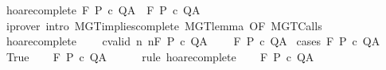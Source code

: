 \begin{isabellebody}
\isanewline
{}\isamarkupfalse%
%
\endisatagproof
{\isafoldproof}%
%
\isadelimproof
\isanewline
%
\endisadelimproof
\isanewline
{}\isamarkupfalse%
\ hoare{\isacharunderscore}complete{\isacharcolon}\ {\isachardoublequoteopen}{\isasymGamma}{\isasymTurnstile}\isactrlbsub {\isacharslash}F\isactrlesub \ P\ c\ Q{\isacharcomma}A\ {\isasymLongrightarrow}\ {\isasymGamma}{\isacharcomma}{\isacharbraceleft}{\isacharbraceright}{\isasymturnstile}\isactrlbsub {\isacharslash}F\isactrlesub \ P\ c\ Q{\isacharcomma}A{\isachardoublequoteclose}\isanewline
%
\isadelimproof
\ \ %
\endisadelimproof
%
\isatagproof
{}\isamarkupfalse%
\ {\isacharparenleft}iprover\ intro{\isacharcolon}\ MGT{\isacharunderscore}implies{\isacharunderscore}complete\ MGT{\isacharunderscore}lemma\ {\isacharbrackleft}OF\ MGT{\isacharunderscore}Calls{\isacharbrackright}{\isacharparenright}%
\endisatagproof
{\isafoldproof}%
%
\isadelimproof
\isanewline
%
\endisadelimproof
\isanewline
{}\isamarkupfalse%
\ hoare{\isacharunderscore}complete{\isacharprime}{\isacharcolon}\ \isanewline
\ \ \ cvalid{\isacharcolon}\ {\isachardoublequoteopen}{\isasymforall}n{\isachardot}\ {\isasymGamma}{\isacharcomma}{\isasymTheta}{\isasymTurnstile}n{\isacharcolon}\isactrlbsub {\isacharslash}F\isactrlesub \ P\ c\ Q{\isacharcomma}A{\isachardoublequoteclose}\isanewline
\ \ \ \ {\isachardoublequoteopen}{\isasymGamma}{\isacharcomma}{\isasymTheta}{\isasymturnstile}\isactrlbsub {\isacharslash}F\isactrlesub \ P\ c\ Q{\isacharcomma}A{\isachardoublequoteclose}\isanewline
%
\isadelimproof
%
\endisadelimproof
%
\isatagproof
{}\isamarkupfalse%
\ {\isacharparenleft}cases\ {\isachardoublequoteopen}{\isasymGamma}{\isasymTurnstile}\isactrlbsub {\isacharslash}F\isactrlesub \ P\ c\ Q{\isacharcomma}A{\isachardoublequoteclose}{\isacharparenright}\isanewline
\ \ \isamarkupfalse%
\ True\isanewline
\ \ \isamarkupfalse%
\ {\isachardoublequoteopen}{\isasymGamma}{\isacharcomma}{\isacharbraceleft}{\isacharbraceright}{\isasymturnstile}\isactrlbsub {\isacharslash}F\isactrlesub \ P\ c\ Q{\isacharcomma}A{\isachardoublequoteclose}\isanewline
\ \ \ \ \isamarkupfalse%
\ {\isacharparenleft}rule\ hoare{\isacharunderscore}complete{\isacharparenright}\isanewline
\ \ \isamarkupfalse%
\ {\isachardoublequoteopen}{\isasymGamma}{\isacharcomma}{\isasymTheta}{\isasymturnstile}\isactrlbsub {\isacharslash}F\ \isactrlesub P\ c\ Q{\isacharcomma}A{\isachardoublequoteclose}\isanewline
\ \ \ \ \isamarkupfalse%

\end{isabellebody}
